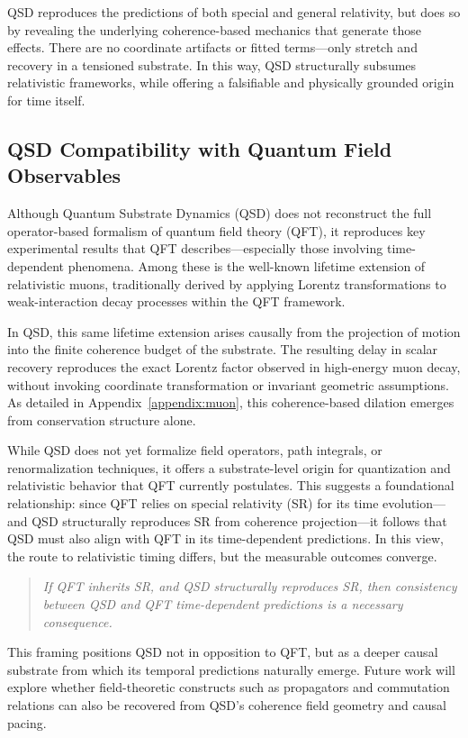 \documentclass[entropy,article,submit,pdftex,moreauthors]{Definitions/mdpi}
\begin{document}
QSD reproduces the predictions of both special and general relativity, but does so by revealing the underlying coherence-based mechanics that generate those effects. There are no coordinate artifacts or fitted terms—only stretch and recovery in a tensioned substrate. In this way, QSD structurally subsumes relativistic frameworks, while offering a falsifiable and physically grounded origin for time itself.

\subsection{QSD Compatibility with Quantum Field Observables}

Although Quantum Substrate Dynamics (QSD) does not reconstruct the full operator-based formalism of quantum field theory (QFT), it reproduces key experimental results that QFT describes—especially those involving time-dependent phenomena. Among these is the well-known lifetime extension of relativistic muons, traditionally derived by applying Lorentz transformations to weak-interaction decay processes within the QFT framework.

In QSD, this same lifetime extension arises causally from the projection of motion into the finite coherence budget of the substrate. The resulting delay in scalar recovery reproduces the exact Lorentz factor observed in high-energy muon decay, without invoking coordinate transformation or invariant geometric assumptions. As detailed in Appendix~\ref{appendix:muon}, this coherence-based dilation emerges from conservation structure alone.

While QSD does not yet formalize field operators, path integrals, or renormalization techniques, it offers a substrate-level origin for quantization and relativistic behavior that QFT currently postulates. This suggests a foundational relationship: since QFT relies on special relativity (SR) for its time evolution—and QSD structurally reproduces SR from coherence projection—it follows that QSD must also align with QFT in its time-dependent predictions. In this view, the route to relativistic timing differs, but the measurable outcomes converge.

\begin{quote}
\textit{If QFT inherits SR, and QSD structurally reproduces SR, then consistency between QSD and QFT time-dependent predictions is a necessary consequence.}
\end{quote}

This framing positions QSD not in opposition to QFT, but as a deeper causal substrate from which its temporal predictions naturally emerge. Future work will explore whether field-theoretic constructs such as propagators and commutation relations can also be recovered from QSD’s coherence field geometry and causal pacing.
\end{document}

